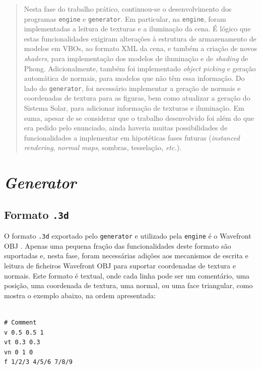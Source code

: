 \documentclass[12pt, a4paper]{article}
\begin{document}
\pagebreak

\begin{abstract}
    \noindent
    Nesta fase do trabalho prático, continuou-se o desenvolvimento dos programas \texttt{engine} e
    \texttt{generator}. Em particular, na \texttt{engine}, foram implementadas a leitura de texturas
    e a iluminação da cena. É lógico que estas funcionalidades exigiram alterações à estrutura de
    armazenamento de modelos em VBOs, ao formato XML da cena, e também a criação de novos
    \emph{shaders}, para implementação dos modelos de iluminação e de \emph{shading} de Phong.
    Adicionalmente, também foi implementado \emph{object picking} e geração automática de normais,
    para modelos que não têm essa informação. Do lado do \texttt{generator}, foi necessário
    implementar a geração de normais e coordenadas de textura para as figuras, bem como atualizar a
    geração do Sistema Solar, para adicionar informação de texturas e iluminação. Em suma, apesar de
    se considerar que o trabalho desenvolvido foi além do que era pedido pelo enunciado, ainda
    haveria muitas possibilidades de funcionalidades a implementar em hipotéticas fases futuras
    (\emph{instanced rendering}, \emph{normal maps}, sombras, tesselação, \emph{etc.}).
\end{abstract}

\section{\emph{Generator}}

\subsection{Formato \texttt{.3d}}

O formato \texttt{.3d} exportado pelo \texttt{generator} e utilizado pela \texttt{engine} é o
Wavefront OBJ \cite{wavefront-obj}. Apenas uma pequena fração das funcionalidades deste formato
são suportadas e, nesta fase, foram necessárias adições aos mecanismos de escrita e leitura de
ficheiros Wavefront OBJ para suportar coordenadas de textura e normais. Este formato é textual, onde
cada linha pode ser um comentário, uma posição, uma coordenada de textura, uma normal, ou uma face
triangular, como mostra o exemplo abaixo, na ordem apresentada:

\begin{lstlisting}

# Comment
v 0.5 0.5 1
vt 0.3 0.3
vn 0 1 0
f 1/2/3 4/5/6 7/8/9
\end{lstlisting}
\end{document}
